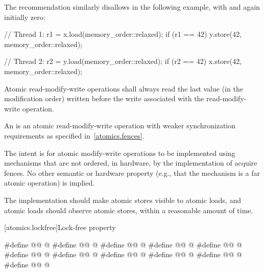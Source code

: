 \pnum
\begin{note}
The recommendation similarly disallows  in the
following example, with  and  again initially zero:

\begin{codeblock}
// Thread 1:
r1 = x.load(memory_order::relaxed);
if (r1 == 42) y.store(42, memory_order::relaxed);
\end{codeblock}

\begin{codeblock}
// Thread 2:
r2 = y.load(memory_order::relaxed);
if (r2 == 42) x.store(42, memory_order::relaxed);
\end{codeblock}
\end{note}

\pnum
Atomic read-modify-write operations shall always read the last value
(in the modification order) written before the write associated with
the read-modify-write operation.

\pnum
An  is
an atomic read-modify-write operation
with weaker synchronization requirements as specified in~\ref{atomics.fences}.
\begin{note}
The intent is for atomic modify-write operations
to be implemented using mechanisms that are not ordered, in hardware,
by the implementation of acquire fences.
No other semantic or hardware property
(e.g., that the mechanism is a far atomic operation) is implied.
\end{note}

\pnum
\recommended
The implementation should make atomic stores visible to atomic loads,
and atomic loads should observe atomic stores,
within a reasonable amount of time.

[atomics.lockfree]{Lock-free property}

\begin{codeblock}
#define @@ @\unspec@
#define @@ @\unspec@
#define @@ @\unspec@
#define @@ @\unspec@
#define @@ @\unspec@
#define @@ @\unspec@
#define @@ @\unspec@
#define @@ @\unspec@
#define @@ @\unspec@
#define @@ @\unspec@
#define @@ @\unspec@
\end{codeblock}

